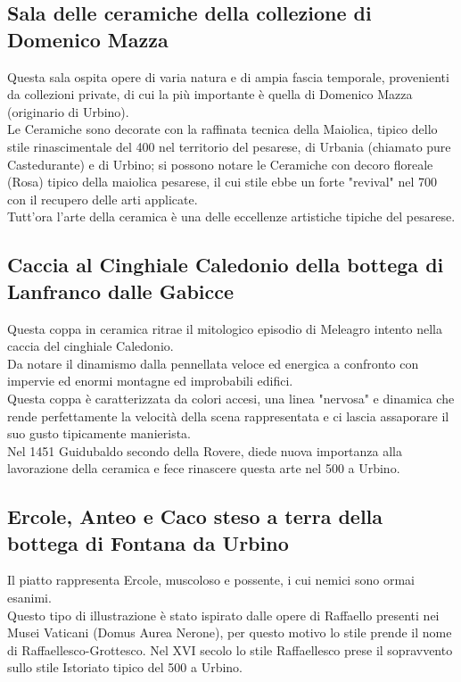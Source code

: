 \documentclass[hidelinks,12pt,a4paper]{article}
\begin{document}
\begin{flushleft}
			\section{Sala delle ceramiche della collezione di Domenico Mazza}
			Questa sala ospita opere di varia natura e di ampia fascia temporale, provenienti da collezioni private, di cui la più importante è quella di Domenico Mazza (originario di Urbino).\\ 
			Le Ceramiche sono decorate con la raffinata tecnica della Maiolica, tipico dello stile rinascimentale del 400 nel territorio del pesarese, di Urbania (chiamato pure Castedurante) e di Urbino; si possono notare le Ceramiche con decoro floreale (Rosa) tipico della maiolica pesarese, il cui stile ebbe un forte "revival" nel 700 con il recupero delle arti applicate.\\
			Tutt'ora l'arte della ceramica è una delle eccellenze artistiche tipiche del pesarese.
	
			\subsection{Caccia al Cinghiale Caledonio della bottega di Lanfranco dalle Gabicce}
			Questa coppa in ceramica ritrae il mitologico episodio di Meleagro intento nella caccia del cinghiale Caledonio.\\
			Da notare il dinamismo dalla pennellata veloce ed energica a confronto con impervie ed enormi montagne ed improbabili edifici.\\
			Questa coppa è caratterizzata da colori accesi, una linea "nervosa" e dinamica che rende perfettamente la velocità della scena rappresentata e ci lascia assaporare il suo gusto tipicamente manierista.\\
			Nel 1451 Guidubaldo secondo della Rovere, diede nuova importanza alla lavorazione della ceramica e fece rinascere questa arte nel 500 a Urbino.
	
			\subsection{Ercole, Anteo e Caco steso a terra della bottega di Fontana da Urbino}
			Il piatto rappresenta Ercole, muscoloso e possente, i cui nemici sono ormai esanimi.\\ 
			Questo tipo di illustrazione è stato ispirato dalle opere di Raffaello presenti nei Musei Vaticani (Domus Aurea Nerone), per questo motivo lo stile prende il nome di Raffaellesco-Grottesco. Nel XVI secolo lo stile Raffaellesco prese il sopravvento sullo stile Istoriato tipico del 500 a Urbino.
	

\end{flushleft}
\end{document}
